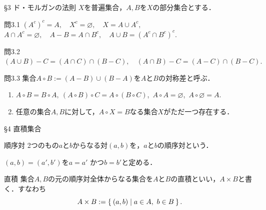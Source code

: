 \documentclass[uplatex,a4paper,dvipdfmx,aspectratio=169,11pt]{beamer}
\begin{document}
\begin{frame}[fragile]{\S 3 ド・モルガンの法則}
    $X$を普遍集合，$A, B$を$X$の部分集合とする．
    \begin{exampleblock}{問3.1}
        \centering
        \begin{math}
            (A^c)^c = A, \quad X^c = \varnothing, \quad X = A \cup A^c,
        \end{math}\\
        \begin{math}
            A \cap A^c = \varnothing, \quad A - B = A \cap B^c, \quad A \cup B = (A^c \cap B^c)^c.
        \end{math}
    \end{exampleblock}
    \begin{exampleblock}{問3.2}
        \centering
        \begin{math}
            (A \cup B) - C = (A \cap C) \cap (B - C), \quad (A \cap B) - C = (A - C) \cap (B - C).
        \end{math}
    \end{exampleblock}
    \begin{exampleblock}{問3.3}
        集合$A \circ B := (A - B) \cup (B - A)$を$A$と$B$の\alert{対称差}と呼ぶ．
        \begin{enumerate}[(1)]
            \item $A \circ B = B \circ A,\ (A \circ B) \circ C = A \circ (B \circ C)$,\ $A \circ A = \varnothing$,\ $A \circ \varnothing = A$.
            \item 任意の集合$A, B$に対して，$A \circ X = B$なる集合$X$がただ一つ存在する．
        \end{enumerate}
    \end{exampleblock}
\end{frame}

\begin{frame}[fragile]{\S 4 直積集合}
    \begin{block}{順序対}
        2つのもの$a$と$b$からなる対$(a, b)$を，$a$と$b$の\alert{順序対}という．
    \end{block}
    \medskip

    $(a, b) = (a', b')$を$a = a'$ かつ$b = b'$と定める．

    \medskip
    \begin{block}{直積}
        集合$A, B$の元の順序対全体からなる集合を$A$と$B$の\alert{直積}といい，$A \times B$と書く．すなわち
        \begin{equation*}
            A \times B := \Set{(a, b) | a \in A,\ b \in B}.
        \end{equation*}
    \end{block}
\end{frame}
\end{document}
